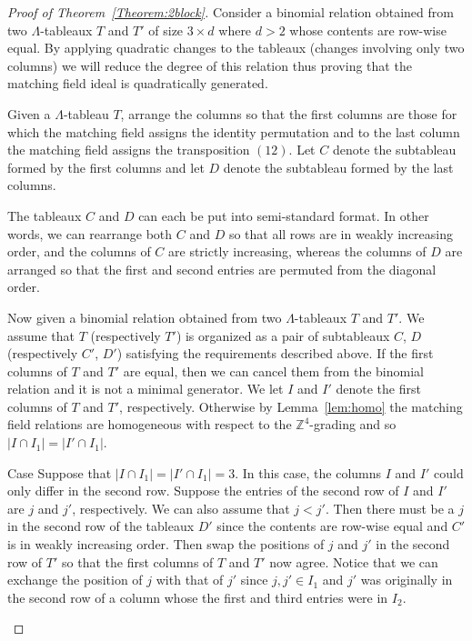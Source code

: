 \documentclass[ALCO,ThmDefs,Unicode,epreuves]{cedram}
\begin{document}
\begin{proof}[Proof of Theorem~\ref{Theorem:2block}]

Consider a binomial relation obtained from two $\Lambda$-tableaux $T$ and $T'$ of size $3 \times d$ where $d >2$ whose contents are row-wise equal. By applying quadratic changes to the tableaux (changes involving only two columns) we will reduce the degree of this relation thus proving that the matching field ideal is quadratically generated. 

Given a $\Lambda$-tableau $T$, arrange the columns so that the first columns are those for which the matching field assigns the identity permutation and to the last column the matching field assigns the transposition $(12)$. Let $C$ denote the subtableau formed by the first columns and let $D$ denote the subtableau formed by the last columns. 

The tableaux $C$ and $D$ can each be put into semi-standard format. 
In other words, we can rearrange both $C$ and $D$ so that all rows are in weakly increasing order, and the columns of $C$ are strictly increasing, whereas the columns of $D$ are arranged so that the first and second entries are permuted from the diagonal order. 

Now given a binomial relation obtained from two $\Lambda$-tableaux $T$ and $T'$. We assume that $T$ (respectively $T'$) is organized as a pair of subtableaux $C$, $D$ (respectively $C'$, $D'$) satisfying the requirements described above. 
 If the first columns of $T$ and $T'$ are equal, then we can cancel them from the binomial relation and it is not a minimal generator. 
 We let $I$ and $I'$ denote the first columns of $T$ and $T'$, respectively. 
Otherwise by Lemma~\ref{lem:homo} the matching field relations are homogeneous with respect to the $\mathbb{Z}^4$-grading and so $\lvert I \cap I_1 \rvert = \lvert I' \cap I_1\rvert$.

\let\oldthecdrthm\thecdrthm
\setcounter{cdrthm}{0}
\def\thecdrthm{\arabic{cdrthm}}
\begin{enonce}[remark]{Case}\label{Case1}%
Suppose that $\lvert I \cap I_1 \rvert = \lvert I' \cap I_1\rvert = 3$. In this case, the columns $I$ and $I'$ could only differ in the second row. Suppose the entries of the second row of $I$ and $I'$ are $j $ and $j'$, respectively. We can also assume that $j <j'$. 
Then there must be a $j$ in the second row of the tableaux $D'$ since the contents are row-wise equal and $C'$ is in weakly increasing order. Then swap the positions of $j$ and $j'$ in the second row of $T'$ so that the first columns of $T$ and $T'$ now agree. Notice that we can exchange the position of $j$ with that of $j'$ since $j, j' \in I_1$ and $j'$ was originally in the second row of a column whose the first and third entries were in $I_2$. 
\end{enonce}


\end{proof}
\end{document}
